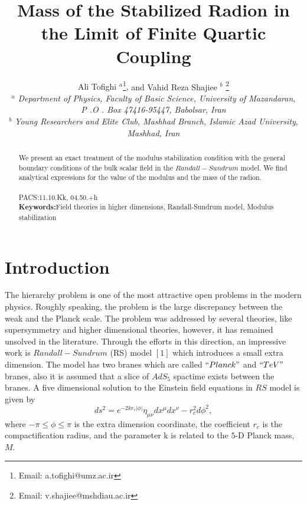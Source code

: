\documentclass[12pt]{article}
\begin{document}
\date{\vspace{-5ex}}
\title{\boldmath Mass of the Stabilized Radion in the Limit of Finite Quartic Coupling}
\author{{Ali Tofighi $^{a}$\thanks{Email: a.tofighi@umz.ac.ir},\hspace{1mm} }
  and \hspace{1mm}Vahid Reza Shajiee $^{b}$
\thanks{Email: v.shajiee@mshdiau.ac.ir}\hspace{1mm} \\
{$^{a}$ \emph{Department of Physics, Faculty of Basic Science, University of Mazandaran},}\\
{\emph{P .O . Box 47416-95447, Babolsar, Iran}}\\
{$^{b}$ \emph{Young Researchers and Elite Club, Mashhad Branch, Islamic Azad University},}\\
{\emph{Mashhad, Iran}}\\  } \maketitle

\begin{abstract}

 We present an exact treatment of the modulus stabilization condition with
the general boundary conditions of the bulk scalar field in the $Randall-Sundrum$ model. We find
analytical expressions for the value of the modulus and the mass of
the radion.
\\\\
\noindent
%
PACS:11.10.Kk, 04.50.+h\\
{\bf Keywords:}Field theories in higher dimensions,
Randall-Sundrum model, Modulus stabilization \\
 \end{abstract}


\section{Introduction}


 The hierarchy problem is one of the most attractive open problems in the modern physics. Roughly speaking, the problem is the large discrepancy between the weak and the Planck scale. The problem was addressed by several theories, like supersymmetry and higher dimensional theories, however, it has remained unsolved in the literature. Through the efforts in this direction, an impressive work is $Randall-Sundrum$ (RS) model $[1]$ which introduces a small extra dimension. The model has two branes which are called $``Planck"$ and $``TeV"$ branes, also it is assumed that a slice of $AdS_{5}$ spactime exists between the branes. A five dimensional solution to the Einstein field equations in $RS$ model is given by
\begin{equation}
ds^2=e^{-2 k r_{c} |\phi|}\eta_{\mu\nu}dx^\mu dx^\nu-r_{c}^2 d\phi^2,
\end{equation}
where $-\pi \leq \phi \leq \pi$ is the extra dimension coordinate, the coefficient $r_{c}$ is
the compactification radius, and the parameter k is related to the $5$-D Planck mass, $M$.
\end{document}
